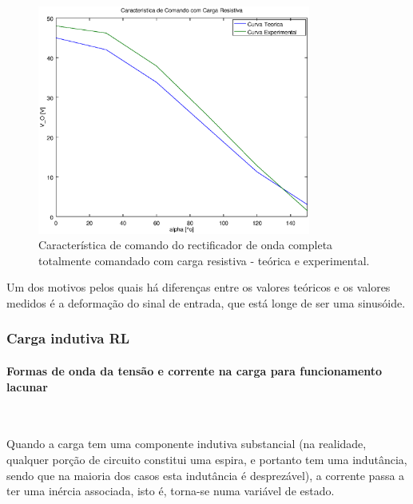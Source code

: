 \documentclass[a4paper,11pt]{article}
\numberwithin{equation}{section}
\begin{document}
\begin{figure}[H]
	\centering
	\includegraphics[keepaspectratio=true, width=0.8\textwidth]{img/comando1}
	\caption{Característica de comando do rectificador de onda completa totalmente comandado com carga resistiva - teórica e experimental.}
	\label{fig:comando1}
	\vspace{-0.8em}
\end{figure}

Um dos motivos pelos quais há diferenças entre os valores teóricos e os valores medidos é a deformação do sinal de entrada, que está longe de ser uma sinusóide.

\subsubsection{Carga indutiva RL}

\paragraph{Formas de onda da tensão e corrente na carga para funcionamento lacunar} \mbox{}\

Quando a carga tem uma componente indutiva substancial (na realidade, qualquer porção de circuito constitui uma espira, e portanto tem uma indutância, sendo que na maioria dos casos esta indutância é desprezável), a corrente passa a ter uma inércia associada, isto é, torna-se numa variável de estado.
\end{document}
